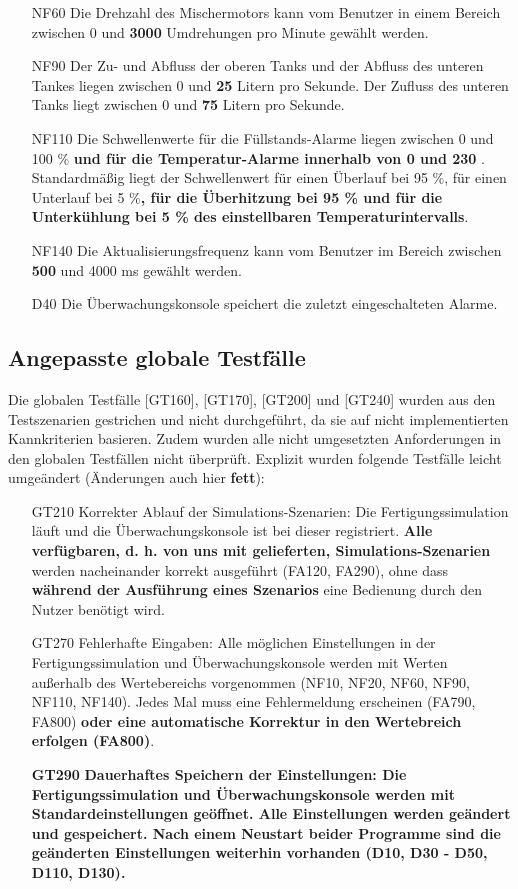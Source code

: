 \documentclass[parskip=full]{scrartcl}
\begin{document}
\begin{enumerate}
	\item[NF60] Die Drehzahl des Mischermotors kann vom Benutzer in einem Bereich zwischen 0 und \textbf{3000} Umdrehungen pro Minute gewählt werden.
	\item[NF90] Der Zu- und Abfluss der oberen Tanks und der Abfluss des unteren Tankes liegen zwischen 0 und \textbf{25} Litern pro Sekunde. Der Zufluss des unteren Tanks liegt zwischen 0 und \textbf{75} Litern pro Sekunde.
	\item[NF110] Die Schwellenwerte für die Füllstands-Alarme liegen zwischen 0 und 100 \% \textbf{und für die Temperatur-Alarme innerhalb von 0 \textcelsius und 230 \textcelsius}. Standardmäßig liegt der Schwellenwert für einen Überlauf bei 95 \%, für einen Unterlauf bei 5 \%\textbf{, für die Überhitzung bei 95 \% und für die Unterkühlung bei 5 \% des einstellbaren Temperaturintervalls}.
	\item[NF140] Die Aktualisierungsfrequenz kann vom Benutzer im Bereich zwischen \textbf{500} und 4000 ms gewählt werden.
	\item[D40] Die Überwachungskonsole speichert die zuletzt eingeschalteten Alarme.
\end{enumerate}

\subsection{Angepasste globale Testfälle}
Die globalen Testfälle [GT160], [GT170], [GT200] und [GT240] wurden aus den Testszenarien gestrichen und nicht durchgeführt, da sie auf nicht implementierten Kannkriterien basieren.
Zudem wurden alle nicht umgesetzten Anforderungen in den globalen Testfällen nicht überprüft. Explizit wurden folgende Testfälle leicht umgeändert (Änderungen auch hier \textbf{fett}):

\begin{enumerate}
	\item[GT210] Korrekter Ablauf der Simulations-Szenarien: Die Fertigungssimulation läuft und die Überwachungskonsole ist bei dieser registriert. \textbf{Alle verfügbaren, d. h. von uns mit gelieferten, Simulations-Szenarien} werden nacheinander korrekt ausgeführt (FA120, FA290), ohne dass \textbf{während der Ausführung eines Szenarios} eine Bedienung durch den Nutzer benötigt wird.
	\item[GT270] Fehlerhafte Eingaben: Alle möglichen Einstellungen in der Fertigungssimulation und Überwachungskonsole werden mit Werten außerhalb des Wertebereichs vorgenommen (NF10, NF20, NF60, NF90, NF110, NF140). Jedes Mal muss eine Fehlermeldung erscheinen (FA790, FA800) \textbf{oder eine automatische Korrektur in den Wertebreich erfolgen (FA800)}.
	\item[\textbf{GT290}] \textbf{Dauerhaftes Speichern der Einstellungen: Die Fertigungssimulation und Überwachungskonsole werden mit Standardeinstellungen geöffnet. Alle Einstellungen werden geändert und gespeichert. Nach einem Neustart beider Programme sind die geänderten Einstellungen weiterhin vorhanden (D10, D30 - D50, D110, D130).}
\end{enumerate}
\end{document}
